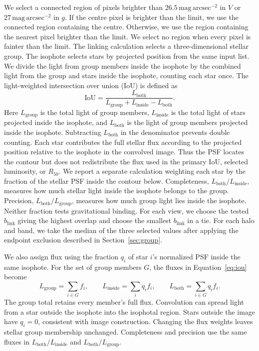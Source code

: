 \documentclass[usenatbib]{mnras}
\begin{document}
We select a connected region of pixels brighter than
$26.5\,\mathrm{mag\,arcsec}^{-2}$ in $V$ or
$27\,\mathrm{mag\,arcsec}^{-2}$ in $g$.
If the centre pixel is brighter than the limit, we use the connected
region containing the centre. Otherwise, we use the region
containing the nearest pixel brighter than the limit. We select no
region when every pixel is fainter than the limit.
The linking calculation selects a three-dimensional stellar group.
The isophote selects stars by projected position from the same input
list. We divide the light
from group members inside the isophote by the combined light from the
group and stars inside the isophote, counting each star once.
The light-weighted intersection over union (IoU) is defined as
\begin{equation}
\mathrm{IoU}
=
\frac{L_{\mathrm{both}}}
{L_{\mathrm{group}}+L_{\mathrm{inside}}-L_{\mathrm{both}}}.
\label{eq:iou}
\end{equation}
Here $L_{\mathrm{group}}$ is the total light of group members,
$L_{\mathrm{inside}}$ is the total light of stars projected inside the
isophote, and $L_{\mathrm{both}}$ is the light of group members projected
inside the isophote. Subtracting $L_{\mathrm{both}}$ in the denominator
prevents double counting. Each star contributes the full stellar flux
according to the projected position relative to the isophote in the
convolved image. Thus the PSF locates the contour but does not redistribute
the flux used in the primary IoU, selected luminosity, or $R_{50}$. We report
a separate calculation weighting each star by the fraction of the stellar PSF
inside the contour below.
Completeness, $L_{\mathrm{both}}/L_{\mathrm{inside}}$, measures how much
stellar light inside the isophote belongs to the group. Precision,
$L_{\mathrm{both}}/L_{\mathrm{group}}$, measures how much group light lies
inside the isophote. Neither fraction tests gravitational binding.
For each view, we choose the tested $b_{\mathrm{link}}$ giving the highest overlap and
choose the smallest $b_{\mathrm{link}}$ in a tie. For each halo and band, we take the
median of the three selected values after applying the endpoint
exclusion described in Section~\ref{sec:group}.

We also assign flux using the fraction $q_i$ of star $i$'s normalized
PSF inside the same isophote. For the set of group members $G$,
the fluxes in Equation~\eqref{eq:iou} become
\begin{equation}
L_{\mathrm{group}}=\sum_{i\in G}f_i,\qquad
L_{\mathrm{inside}}=\sum_i q_i f_i,\qquad
L_{\mathrm{both}}=\sum_{i\in G}q_i f_i.
\label{eq:psfscore}
\end{equation}
The group total retains every member's full flux.
Convolution can spread light from a star outside the isophote into the
isophotal region. Stars outside the image have $q_i=0$, consistent
with image construction. Changing the flux weights leaves stellar
group membership unchanged.
Completeness and precision use the same fluxes in
$L_{\mathrm{both}}/L_{\mathrm{inside}}$ and
$L_{\mathrm{both}}/L_{\mathrm{group}}$.
\end{document}
